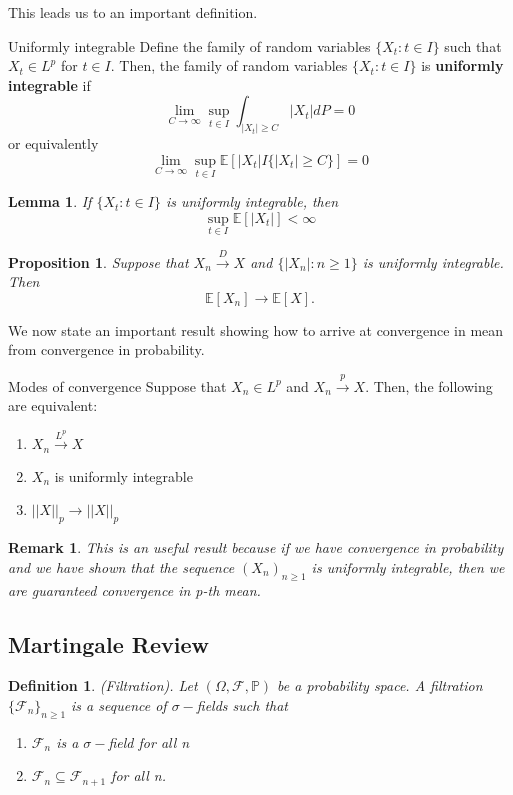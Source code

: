 \documentclass[twoside]{article}
\newtheorem{lemma}[theorem]{Lemma}
\newtheorem{proposition}[theorem]{Proposition}
\newtheorem{definition}[theorem]{Definition}
\newtheorem{remark}[theorem]{Remark}
\begin{document}
This leads us to an important definition.

\begin{definition_exam}{Uniformly integrable}{} Define the family of random variables $\{X_t: t \in I\}$ such that $X_t \in L^p$ for $t \in I.$ Then, the family of random variables $\{X_t: t \in I\}$ is \textbf{uniformly integrable} if 
$$
\lim_{C \rightarrow \infty}\sup_{t \in I}\int_{|X_{t}| \geq C}|X_t|dP = 0
$$
or equivalently
$$
\lim_{C \rightarrow \infty}\sup_{t \in I}\mathbb{E}[|X_t|I\{|X_t| \geq C\}] = 0
$$
\end{definition_exam}

\begin{lemma} If $\{X_t: t \in I\}$ is uniformly integrable, then 
$$
\sup_{t \in I}\mathbb{E}[|X_t|] < \infty
$$
\end{lemma}

\begin{proposition} Suppose that $X_n \xrightarrow{D} X$ and $\{|X_n|: n \geq 1\}$ is uniformly integrable. Then 
$$
\mathbb{E}[X_n] \rightarrow \mathbb{E}[X].
$$
\end{proposition}


We now state an important result showing how to arrive at convergence in mean from convergence in probability.
\begin{proposition_exam}{Modes of convergence}{} Suppose that $X_n \in L^p$ and $X_n \xrightarrow{p} X.$ Then, the following are equivalent:
\begin{enumerate}
\item $X_n \xrightarrow{L^{p}} X$
\item $X_n$ is uniformly integrable 
\item $||X||_p \rightarrow ||X||_p$
\end{enumerate}
\end{proposition_exam}

\begin{remark} This is an useful result because if we have convergence in probability and we have shown that the sequence $(X_n)_{n \geq 1}$ is uniformly integrable, then we are guaranteed convergence in p-th mean.
\end{remark}

\subsection{Martingale Review}

\begin{definition}(Filtration). Let $(\Omega, \mathcal{F}, \mathbb{P})$ be a probability space. A filtration  $\{\mathcal{F}_{n}\}_{n \geq 1}$ is a sequence of $\sigma-$fields such that 
\begin{enumerate}
  \item $\mathcal{F}_n$ is a $\sigma-$field for all n 
  \item $\mathcal{F}_{n} \subseteq \mathcal{F}_{n+1}$ for all n.
\end{enumerate}
\end{definition}
\end{document}
